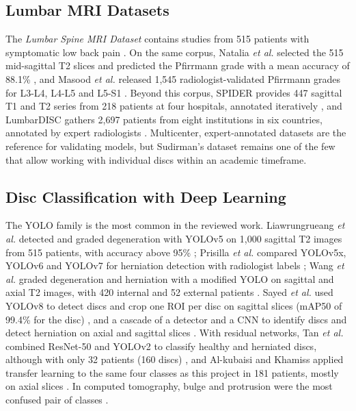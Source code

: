 \subsection{Lumbar MRI Datasets}
The \emph{Lumbar Spine MRI Dataset} contains studies from 515 patients with symptomatic low back pain \cite{sudirman2019}. On the same corpus, Natalia \emph{et al.} selected the 515 mid-sagittal T2 slices and predicted the Pfirrmann grade with a mean accuracy of 88.1\% \cite{natalia2024}, and Masood \emph{et al.} released 1,545 radiologist-validated Pfirrmann grades for L3-L4, L4-L5 and L5-S1 \cite{masood2026}. Beyond this corpus, SPIDER provides 447 sagittal T1 and T2 series from 218 patients at four hospitals, annotated iteratively \cite{vandergraaf2024}, and LumbarDISC gathers 2,697 patients from eight institutions in six countries, annotated by expert radiologists \cite{richards2026}. Multicenter, expert-annotated datasets are the reference for validating models, but Sudirman's dataset remains one of the few that allow working with individual discs within an academic timeframe.

\subsection{Disc Classification with Deep Learning}
The YOLO family is the most common in the reviewed work. Liawrungrueang \emph{et al.} detected and graded degeneration with YOLOv5 on 1,000 sagittal T2 images from 515 patients, with accuracy above 95\% \cite{liawrungrueang2023}; Prisilla \emph{et al.} compared YOLOv5x, YOLOv6 and YOLOv7 for herniation detection with radiologist labels \cite{prisilla2023}; Wang \emph{et al.} graded degeneration and herniation with a modified YOLO on sagittal and axial T2 images, with 420 internal and 52 external patients \cite{wang2025}. Sayed \emph{et al.} used YOLOv8 to detect discs and crop one ROI per disc on sagittal slices (mAP50 of 99.4\% for the disc) \cite{sayed2025scirep}, and a cascade of a detector and a CNN to identify discs and detect herniation on axial and sagittal slices \cite{sayed2025imu}. With residual networks, Tan \emph{et al.} combined ResNet-50 and YOLOv2 to classify healthy and herniated discs, although with only 32 patients (160 discs) \cite{tan2024}, and Al-kubaisi and Khamiss applied transfer learning to the same four classes as this project in 181 patients, mostly on axial slices \cite{alkubaisi2022}. In computed tomography, bulge and protrusion were the most confused pair of classes \cite{gao2025}.

